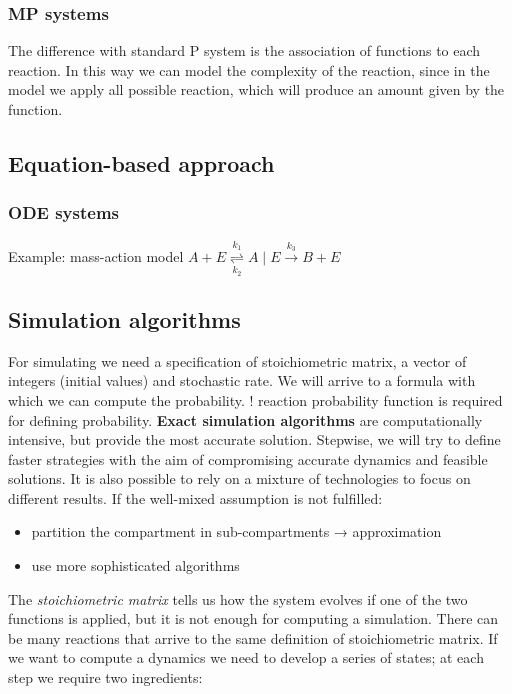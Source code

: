    \subsubsection{MP systems}
    The difference with standard P system is the association of functions to each reaction.
    In this way we can model the complexity of the reaction, since in the model we apply all possible reaction, which will produce an amount given by the function.

  \subsection{Equation-based approach}

    \subsubsection{ODE systems}
    Example: mass-action model
    \(A+E \underset{k_2}{\overset{k_1}{\rightleftharpoons}}A \mid E \stackrel{k_3}{\longrightarrow}B+E\)

  \subsection{Simulation algorithms}
  For simulating we need a specification of stoichiometric matrix, a vector of integers (initial values) and stochastic rate.
  We will arrive to a formula with which we can compute the probability.
  ! reaction probability function is required for defining probability.
  \textbf{Exact simulation algorithms} are computationally intensive, but provide the most accurate solution.
  Stepwise, we will try to define faster strategies with the aim of compromising accurate dynamics and feasible solutions.
  It is also possible to rely on a mixture of technologies to focus on different results.
  If the well-mixed assumption is not fulfilled:

  \begin{itemize}
    \item partition the compartment in sub-compartments → approximation
    \item use more sophisticated algorithms
  \end{itemize}

  The \emph{stoichiometric matrix} tells us how the system evolves if one of the two functions is applied, but it is not enough for computing a simulation.
  There can be many reactions that arrive to the same definition of stoichiometric matrix.
  If we want to compute a dynamics we need to develop a series of states; at each step we require two ingredients:

